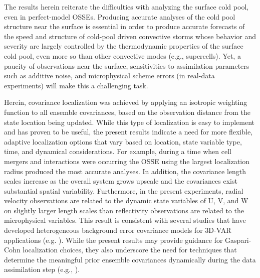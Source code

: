 The results herein reiterate the difficulties with analyzing the surface cold pool, even in perfect-model OSSEs. Producing accurate analyses of the cold pool structure near the surface is essential in order to produce accurate forecasts of the speed and structure of cold-pool driven convective storms whose behavior and severity are largely controlled by the thermodynamic properties of the surface cold pool, even more so than other convective modes (e.g., supercells). Yet, a paucity of observations near the surface, sensitivities to assimilation parameters such as additive noise, and microphysical scheme errors (in real-data experiments) will make this a challenging task.

Herein, covariance localization was achieved by applying an isotropic weighting function to all ensemble covariances, based on the observation distance from the state location being updated. While this type of localization is easy to implement and has proven to be useful, the present results indicate a need for more flexible, adaptive localization options that vary based on location, state variable type, time, and dynamical considerations. For example, during a time when cell mergers and interactions were occurring the OSSE using the largest localization radius produced the most accurate analyses. In addition, the covariance length scales increase as the overall system grows upscale and the covariances exist substantial spatial variability. Furthermore, in the present experiments, radial velocity observations are related to the dynamic state variables of U, V, and W on slightly larger length scales than reflectivity observations are related to the microphysical variables. This result is consistent with several studies that have developed heterogeneous background error covariance models for 3D-VAR applications (e.g. \citealt{micheletal11}). While the present results may provide guidance for Gaspari-Cohn localization choices, they also underscore the need for techniques that determine the meaningful prior ensemble covariances dynamically during the data assimilation step (e.g., \citealt{bishophodyss09a,bishophodyss09b,chenoliver09}).

